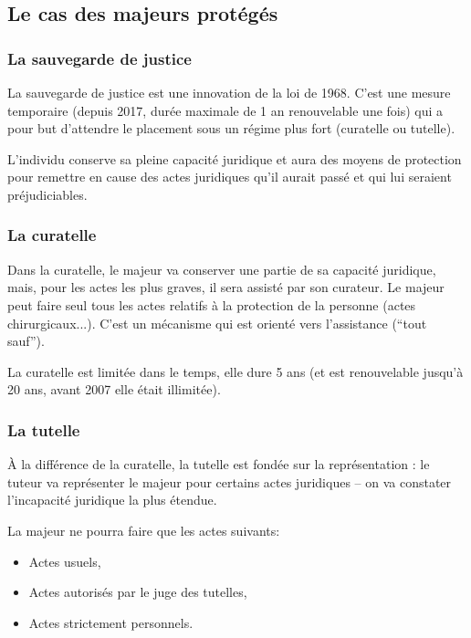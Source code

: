\documentclass[10pt,a4paper]{article}
\begin{document}
\subsection{Le cas des majeurs protégés}

\subsubsection{La sauvegarde de justice}

La sauvegarde de justice est une innovation de la loi de 1968. C'est une mesure temporaire (depuis 2017, durée maximale de 1 an renouvelable une fois) qui a pour but d'attendre le placement sous un régime plus fort (curatelle ou tutelle).

L'individu conserve sa pleine capacité juridique et aura des moyens de protection pour remettre en cause des actes juridiques qu'il aurait passé et qui lui seraient préjudiciables.

\subsubsection{La curatelle}

Dans la curatelle, le majeur va conserver une partie de sa capacité juridique, mais, pour les actes les plus graves, il sera assisté par son curateur. Le majeur peut faire seul tous les actes relatifs à la protection de la personne (actes chirurgicaux...). C'est un mécanisme qui est orienté vers l'assistance (``tout sauf'').

La curatelle est limitée dans le temps, elle dure 5 ans (et est renouvelable jusqu'à 20 ans, avant 2007 elle était illimitée).

\subsubsection{La tutelle}

À la différence de la curatelle, la tutelle est fondée sur la représentation : le tuteur va représenter le majeur pour certains actes juridiques -- on va constater l'incapacité juridique la plus étendue. 

La majeur ne pourra faire que les actes suivants:
\begin{itemize}
\item Actes usuels,
\item Actes autorisés par le juge des tutelles,
\item Actes strictement personnels.
\end{itemize}
\end{document}
